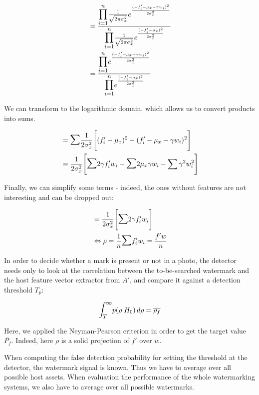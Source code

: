 \documentclass[a4paper,11pt,hidelinks]{article}
\begin{document}
\begin{align}
     & = \frac{\mathlargeer{\prod_{i = 1}^n} \frac{1}{\sqrt{2 \pi \sigma_x^2}} e^\frac{(-f'_i -\mu_x - \gamma w_i)^2}{2 \sigma_x^2}}{\mathlargeer{\prod_{i = 1}^n} \frac{1}{\sqrt{2 \pi \sigma_x^2}} e^\frac{(-f'_i -\mu_x)^2}{2 \sigma_x^2}} \\
     & =\frac{\mathlargeer{\prod_{i = 1}^n} e^\frac{(-f'_i -\mu_x - \gamma w_i)^2}{2 \sigma_x^2}}{\mathlargeer{\prod_{i = 1}^n} e^\frac{(-f'_i -\mu_x)^2}{2 \sigma_x^2}}
\end{align}

We can transform to the logarithmic domain, which allows us to convert products into sums.

\begin{align}
    & = \mathlargeer{\sum} \frac{1}{2 \sigma_x^2} \Bigg[ (f'_i - \mu_x )^2 - (f'_i - \mu_x - \gamma w_i)^2 \Bigg] \\
    & = \frac{1}{2 \sigma_x^2} \Bigg[ \mathlargeer{\sum} 2 \gamma f'_i w_i - \mathlargeer{\sum} 2 \mu_x \gamma w_i - \sum \gamma^2 w_i^2 \Bigg]
\end{align}

Finally, we can simplify some terms - indeed, the ones without features are not interesting and can be dropped out:

\begin{align}
    & = \frac{1}{2 \sigma_x^2} \Bigg[ \mathlargeer{\sum} 2 \gamma f'_i w_i \Bigg] \\
    & \Leftrightarrow \rho = \frac{1}{n} \mathlargeer{\sum} f'_i w_i = \frac{f' w}{n}
\end{align}

In order to decide whether a mark is present or not in a photo, the detector needs only to look at the correlation between the to-be-searched watermark and the host feature vector extractor from $A'$, and compare it against a detection threshold $T_p$:

\begin{align}
    \mathlarger{\int_{T}^{\infty}} p(\rho|H_0) \,d\rho = \overline{\rho_f} 
\end{align}

Here, we applied the Neyman-Pearson criterion in order to get the target value $\overline{P_f}$. Indeed, here $\rho$ is a solid projection of $f'$ over $w$. 

When computing the false detection probability for setting the threshold at the detector, the watermark signal is known. Thus we have to average over all possible host assets. When evaluation the performance of the whole watermarking systems, we also have to average over all possible watermarks.
\end{document}
